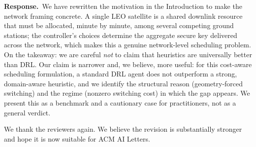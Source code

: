 \documentclass[11pt]{article}
\newcommand{\resp}{\par\smallskip\noindent\textbf{Response.}\ }
\begin{document}
\resp We have rewritten the motivation in the Introduction to make the network
framing concrete. A single LEO satellite is a shared downlink resource that must be
allocated, minute by minute, among several competing ground stations; the
controller's choices determine the aggregate secure key delivered across the
network, which makes this a genuine network-level scheduling problem. On the
takeaway: we are careful \emph{not} to claim that heuristics are universally better
than DRL. Our claim is narrower and, we believe, more useful: for this cost-aware
scheduling formulation, a standard DRL agent does not outperform a strong,
domain-aware heuristic, and we identify the structural reason (geometry-forced
switching) and the regime (nonzero switching cost) in which the gap appears. We
present this as a benchmark and a cautionary case for practitioners, not as a
general verdict.

\bigskip
\noindent We thank the reviewers again. We believe the revision is substantially
stronger and hope it is now suitable for ACM AI Letters.
\end{document}

